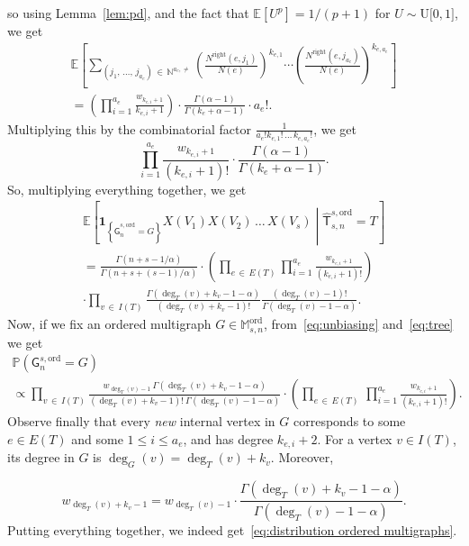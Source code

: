 \documentclass[10pt]{amsart}
\theoremstyle{definition}\newtheorem{defi}[theo]{Definition}\newtheorem{rema}[theo]{Remark}\newtheorem{exam}[theo]{Example}\newtheorem{exem}[theo]{Example}\newtheorem{nota}[theo]{Notation}
\newcommand{\Ec}[1]{\mathbb{E} \left[#1\right]}
\newcommand{\Pp}[1]{\mathbb{P} \left(#1\right)}
\newcommand{\Ecsq}[2]{\mathbb{E} \left[#1\mathrel{}\middle|\mathrel{}#2\right]}
\newcommand{\intervalle}[4]{\mathopen{#1}#2
\mathclose{}\mathpunct{},#3
\mathclose{#4}}
\newcommand{\intervalleff}[2]{\intervalle{[}{#1}{#2}{]}}
\newcommand{\ind}[1]{\mathbf{1}_{\left\lbrace #1 \right\rbrace}}
\newcommand{\ord}{\mathrm{ord}}
\newcommand{\Rightll}{\mathrm{right}}
\newcommand{\rmU}{\mathrm{U}}
\newcommand{\sG}{\mathsf{G}}
\newcommand{\sT}{\mathsf{T}}
\newcommand{\M}{\mathbb{M}}
\newcommand{\N}{\mathbb{N}}
\begin{document}
so using Lemma~\ref{lem:pd}, and the fact that $\Ec{U^p}=1/(p+1)$ for $U \sim \rmU\intervalleff{0}{1}$, we get
\begin{multline*}
\Ec{ \sum_{\left(j_1,\,\dots,\,j_{a_e}\right)\,\in \,\N^{a_e,\neq}}
\left(\frac{N^{\Rightll}\left(e,j_1\right)}{N(e)} \right)^{k_{e,1}} \cdots \left(\frac{N^{\Rightll}\left(e, j_{a_e}\right)}{N(e)} \right)^{k_{e,a_e}} } \\
= \left(\prod_{i=1}^{a_e} \frac{w_{k_{e,i}+1}}{k_{e,i}+1}\right)\cdot \frac{\Gamma(\alpha-1)}{\Gamma(k_e+\alpha-1)}\cdot a_e!.
\end{multline*}
Multiplying this by the combinatorial factor $ \frac{1}{a_e!k_{e,1}!\,\dots\,k_{e,a_e}!}$, we get
\[
\prod_{i=1}^{a_e} \frac{w_{k_{e,i}+1}}{\left(k_{e,i}+1\right)!}\cdot \frac{\Gamma\left(\alpha-1\right)}{\Gamma\left(k_e+\alpha-1\right)}.
\]
So, multiplying everything together, we get
\begin{multline}\label{eqn:proba of gluing}
\Ecsq{\ind{\widehat{\sG}_{n}^{s,\ord}=G}X(V_1)X(V_2)\,\dots\,X(V_s)}{\widehat{\sT}_{s,n}^{s,\ord}=T} \\
=\frac{\Gamma\left(n+s-1/\alpha\right)}{\Gamma\left(n+s + (s-1)/\alpha\right)}\cdot\left(\prod_{e\,\in\,E(T)}\prod_{i=1}^{a_e} \frac{w_{k_{e,i}+1}}{\left(k_{e,i}+1\right)!}\right)\\
\cdot\prod_{v\,\in\,I(T)}\frac{\Gamma\left(\deg_T(v)+k_v-1-\alpha\right)}{\left(\deg_T(v)+k_v -1\right)!}\frac{\left(\deg_T(v)-1\right)!}{\Gamma\left(\deg_T(v)-1-\alpha\right)}.
\end{multline}
Now, if we fix an ordered multigraph $G\in \M_{s,n}^{\ord}$, from~\eqref{eq:unbiasing} and~\eqref{eq:tree} we get
\begin{multline*}
\Pp{\sG_{n}^{s,\ord}=G} \\
\propto \prod_{v\,\in\,I(T)} \frac{w_{\deg_T(v)-1} \ \Gamma\left(\deg_T(v) + k_v - 1- \alpha\right)}{\left(\deg_T(v) + k_v - 1\right)! \ \Gamma\left(\deg_T(v) - 1 - \alpha\right)} \cdot \left(\prod_{e\,\in\,E(T)}\,\prod_{i=1}^{a_e} \frac{w_{k_{e,i}+1}}{\left(k_{e,i}+1\right)!}\right).
\end{multline*}
Observe finally that every \emph{new} internal vertex in $G$ corresponds to some $e\in E(T)$ and some $1\leq i \leq a_e$, and has degree $k_{e,i}+2$. For a vertex $v\in I(T)$, its degree in $G$ is $\deg_G(v)=\deg_T(v)+k_v$. Moreover,

\[
w_{\deg_T(v)+k_v-1}=w_{\deg_T(v)-1}\cdot\frac{ \Gamma\left(\deg_T(v)+k_v-1-\alpha\right)}{\Gamma\left(\deg_T(v)-1-\alpha\right)}.
\]
Putting everything together, we indeed get~\eqref{eq:distribution ordered multigraphs}.
\end{document}
